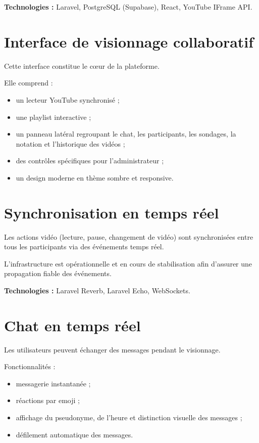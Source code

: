 \documentclass[12pt,a4paper]{report}
\begin{document}
\textbf{Technologies :} Laravel, PostgreSQL (Supabase), React, YouTube IFrame API.

\section{Interface de visionnage collaboratif}

Cette interface constitue le cœur de la plateforme.

Elle comprend :
\begin{itemize}
  \item un lecteur YouTube synchronisé ;
  \item une playlist interactive ;
  \item un panneau latéral regroupant le chat, les participants, les sondages, la notation et l’historique des vidéos ;
  \item des contrôles spécifiques pour l’administrateur ;
  \item un design moderne en thème sombre et responsive.
\end{itemize}

\section{Synchronisation en temps réel}

Les actions vidéo (lecture, pause, changement de vidéo) sont synchronisées entre tous les participants via des événements temps réel.

L’infrastructure est opérationnelle et en cours de stabilisation afin d’assurer une propagation fiable des événements.

\textbf{Technologies :} Laravel Reverb, Laravel Echo, WebSockets.

\section{Chat en temps réel}

Les utilisateurs peuvent échanger des messages pendant le visionnage.

Fonctionnalités :
\begin{itemize}
  \item messagerie instantanée ;
  \item réactions par emoji ;
  \item affichage du pseudonyme, de l’heure et distinction visuelle des messages ;
  \item défilement automatique des messages.
\end{itemize}
\end{document}
